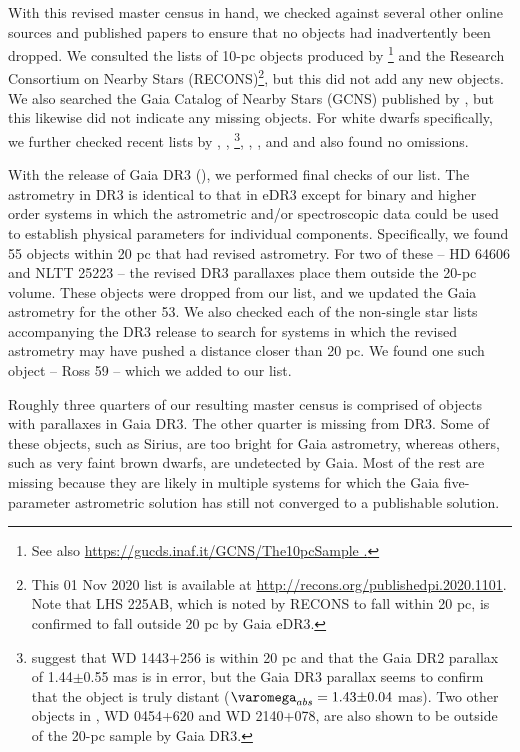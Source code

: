 \documentclass[twocolumn,tighten,twocolappendix]{aastex631}
\begin{document}
With this revised master census in hand, we checked against several other online sources and published papers to ensure that no objects had inadvertently been dropped. We consulted the lists of 10-pc objects produced by \cite{reyle2021}\footnote{See also \url{https://gucds.inaf.it/GCNS/The10pcSample .}} and the Research Consortium on Nearby Stars (RECONS)\footnote{This 01 Nov 2020 list is available at \url {http://recons.org/publishedpi.2020.1101}. Note that LHS 225AB, which is noted by RECONS to fall within 20 pc, is confirmed to fall outside 20 pc by Gaia eDR3.}, but this did not add any new objects. We also searched the Gaia Catalog of Nearby Stars (GCNS) published by \cite{smart2020}, but this likewise did not indicate any missing objects. For white dwarfs specifically, we further checked recent lists by \cite{sion2014}, \cite{mccook2016}, \cite{hollands2018}\footnote{\cite{hollands2018} suggest that WD 1443+256 is within 20 pc and that the Gaia DR2 parallax of 1.44$\pm$0.55 mas is in error, but the Gaia DR3 parallax seems to confirm that the object is truly distant ($\varomega_{abs}=1.43{\pm}0.04$ mas). Two other objects in \cite{hollands2018}, WD 0454+620 and WD 2140+078, are also shown to be outside of the 20-pc sample by Gaia DR3.}, \cite{mccleery2020}, \cite{gentile2021}, and \cite{obrien2023} and also found no omissions.

With the release of Gaia DR3 (\citealt{gaia2022}), we performed final checks of our list. The astrometry in DR3 is identical to that in eDR3 except for binary and higher order systems in which the astrometric and/or spectroscopic data could be used to establish physical parameters for individual components. Specifically, we found 55 objects within 20 pc that had revised astrometry. For two of these -- HD 64606 and NLTT 25223 -- the revised DR3 parallaxes place them outside the 20-pc volume. These objects were dropped from our list, and we updated the Gaia astrometry for the other 53. We also checked each of the non-single star lists accompanying the DR3 release to search for systems in which the revised astrometry may have pushed a distance closer than 20 pc. We found one such object -- Ross 59 -- which we added to our list.

Roughly three quarters of our resulting master census is comprised of objects with parallaxes in Gaia DR3. The other quarter is missing from DR3. Some of these objects, such as Sirius, are too bright for Gaia astrometry, whereas others, such as very faint brown dwarfs, are undetected by Gaia. Most of the rest are missing because they are likely in multiple systems for which the Gaia five-parameter astrometric solution has still not converged to a publishable solution.
\end{document}
